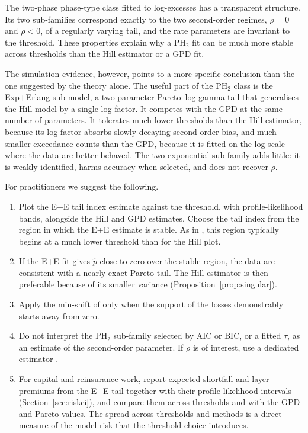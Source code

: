 \documentclass[12pt]{article}
\theoremstyle{definition}
\theoremstyle{remark}
\begin{document}
The two-phase phase-type class fitted to log-excesses has a transparent structure. Its two sub-families correspond exactly to the two second-order regimes, $\rho=0$ and $\rho<0$, of a regularly varying tail, and the rate parameters are invariant to the threshold. These properties explain why a PH$_2$ fit can be much more stable across thresholds than the Hill estimator or a GPD fit.

The simulation evidence, however, points to a more specific conclusion than the one suggested by the theory alone. The useful part of the PH$_2$ class is the Exp+Erlang sub-model, a two-parameter Pareto--log-gamma tail that generalises the Hill model by a single log factor. It competes with the GPD at the same number of parameters. It tolerates much lower thresholds than the Hill estimator, because its log factor absorbs slowly decaying second-order bias, and much smaller exceedance counts than the GPD, because it is fitted on the log scale where the data are better behaved. The two-exponential sub-family adds little: it is weakly identified, harms accuracy when selected, and does not recover $\rho$.

For practitioners we suggest the following.
\begin{enumerate}
\item Plot the E+E tail index estimate against the threshold, with profile-likelihood bands, alongside the Hill and GPD estimates. Choose the tail index from the region in which the E+E estimate is stable. As in \citet{KimKim2015}, this region typically begins at a much lower threshold than for the Hill plot.
\item If the E+E fit gives $\hat p$ close to zero over the stable region, the data are consistent with a nearly exact Pareto tail. The Hill estimator is then preferable because of its smaller variance (Proposition~\ref{prop:singular}).
\item Apply the min-shift of \citet{KimKim2015} only when the support of the losses demonstrably starts away from zero.
\item Do not interpret the PH$_2$ sub-family selected by AIC or BIC, or a fitted $\tau$, as an estimate of the second-order parameter. If $\rho$ is of interest, use a dedicated estimator \citep{FragaAlves2003,Goegebeur2010}.
\item For capital and reinsurance work, report expected shortfall and layer premiums from the E+E tail together with their profile-likelihood intervals (Section~\ref{sec:riskci}), and compare them across thresholds and with the GPD and Pareto values. The spread across thresholds and methods is a direct measure of the model risk that the threshold choice introduces.
\end{enumerate}
\end{document}
